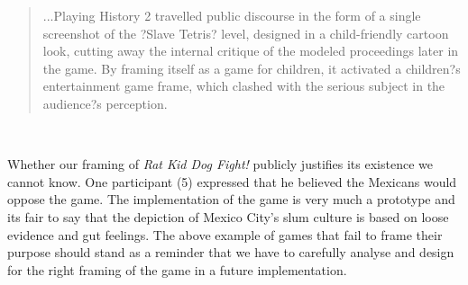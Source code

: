 \blockquote{...Playing History 2 travelled public discourse in the form of a single screenshot of the ?Slave Tetris? level, designed in a child-friendly cartoon look, cutting away the internal critique of the modeled proceedings later in the game. By framing itself as a game for children, it activated a children?s entertainment game frame, which clashed with the serious subject in the audience?s perception.}\citep{deterding2016mechanic}\

Whether our framing of \textit{Rat Kid Dog Fight!} publicly justifies its existence we cannot know. One participant (5) expressed that he believed the Mexicans would oppose the game. The implementation of the game is very much a prototype and its fair to say that the depiction of Mexico City's slum culture is based on loose evidence and gut feelings. The above example of games that fail to frame their purpose should stand as a reminder that we have to carefully analyse and design for the right framing of the game in a future implementation.


